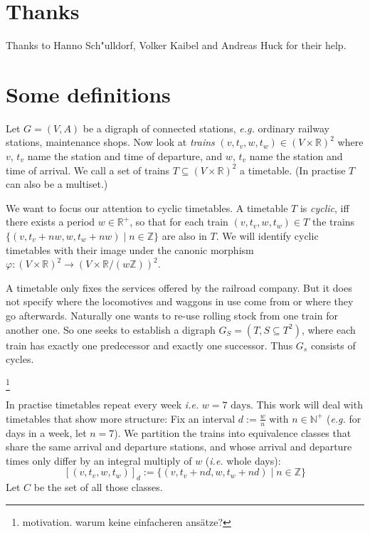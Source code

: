 \documentclass[a4paper]{amsart} %
\def\ie{\emph{i.e.}}
\def\eg{\emph{e.g.}}
\newcommand{\todo}[1]{\footnote{#1}}
\begin{document}
\section{Thanks}
Thanks to Hanno Sch"ulldorf, Volker Kaibel and Andreas Huck for their
help.

\section{Some definitions}

Let \(G=(V,A)\) be a digraph of connected stations, \eg{} ordinary
railway stations, maintenance shops.  Now look at \label{trains}
\textit{trains} \((v, t_v, w, t_w) \in \left(V \times
  \mathbb{R}\right)^2 \) where \(v\), \(t_v\) name the station and
time of departure, and \(w\), \(t_v\) name the station and time of
arrival.  We call a set of trains \(T \subseteq \left(V \times
  \mathbb{R}\right)^2\) a timetable.  (In practise \(T\) can also be a
multiset.)

We want to focus our attention to cyclic timetables.  A timetable
\(T\) is \label{cyclic} \textit{cyclic}, iff there exists a period \(w
\in \mathbb{R}^+\), so that for each train \((v, t_v, w, t_w) \in T\)
the trains \(\{(v, t_v+n w, w, t_w +n w) \mid n \in \mathbb{Z}\}\) are
also in \(T\).  We will identify cyclic timetables with their image
under the canonic morphism \(\varphi \colon \left(V \times
  \mathbb{R}\right)^2 \to \left(V \times \mathbb{R}/{\left(w
      \mathbb{Z}\right)}\right)^2\).

A timetable only fixes the services offered by the railroad company.
But it does not specify where the locomotives and waggons in use come
from or where they go afterwards.  Naturally one wants to re-use
rolling stock from one train for another one.  So one seeks to
establish a digraph \(G_S=(T,S\subseteq T^2)\), where each train has
exactly one predecessor and exactly one successor.  Thus \(G_s\)
consists of cycles.

\todo{motivation.  warum keine einfacheren ansätze?}

In practise timetables repeat every week \ie{} \(w = 7 \textrm{ days}\).
This work will deal with timetables that show more structure: Fix an
interval \(d := \frac{w}{n}\) with \(n \in \mathbb{N}^+\) (\eg{} for
days in a week, let \(n=7\)).  We partition the trains into
equivalence classes that share the same arrival and departure
stations, and whose arrival and departure times only differ by an
integral multiply of \(w\) (\ie{} whole days):
\begin{equation}
  \left[\left( v, t_v, w, t_w \right) \right]_d := \{(v, t_v+n d, w, t_w +n d) \mid n \in \mathbb{Z}\}
\end{equation}
Let \(C\) be the set of all those classes.
\end{document}
